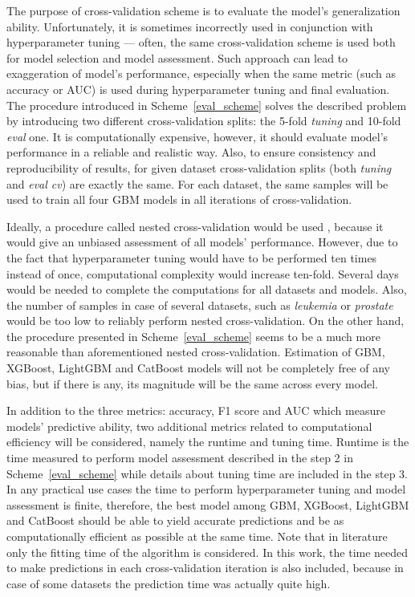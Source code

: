 \documentclass[magisterska, english]{pwr_wmat_praca_dyplomowa}
\theoremstyle{plain}
\numberwithin{theorem}{chapter}
\theoremstyle{definition}
\numberwithin{theorem}{chapter}
\begin{document}
The purpose of cross-validation scheme is to evaluate the model's generalization ability. Unfortunately, it is sometimes incorrectly used in conjunction with hyperparameter tuning --- often, the same cross-validation scheme is used both for model selection and model assessment. Such approach can lead to exaggeration of model's performance, especially when the same metric (such as accuracy or AUC) is used during hyperparameter tuning and final evaluation. The procedure introduced in Scheme~\ref{eval_scheme} solves the described problem by introducing two different cross-validation splits: the 5-fold \emph{tuning} and 10-fold \emph{eval} one.
It is computationally expensive, however, it should evaluate model's performance in a reliable and realistic way. Also, to ensure consistency and reproducibility of results, for given dataset cross-validation splits (both \emph{tuning} and \emph{eval cv}) are exactly the same. For each dataset, the same samples will be used to train all four GBM models in all iterations of cross-validation.

Ideally, a procedure called nested cross-validation would be used \cite{sklearn}, because it would give an unbiased assessment of all models' performance. However, due to the fact that hyperparameter tuning would have to be performed ten times instead of once, computational complexity would increase ten-fold. Several days would be needed to complete the computations for all datasets and models. Also, the number of samples in case of several datasets, such as \emph{leukemia} or \emph{prostate} would be too low to reliably perform nested cross-validation. On the other hand, the procedure presented in Scheme~\ref{eval_scheme} seems to be a much more reasonable than aforementioned nested cross-validation. Estimation of GBM, XGBoost, LightGBM and CatBoost models will not be completely free of any bias, but if there is any, its magnitude will be the same across every model.

In addition to the three metrics: accuracy, F1 score and AUC which measure models' predictive ability, two additional metrics related to computational efficiency will be considered, namely the runtime and tuning time. Runtime is the time measured to perform model assessment described in the step 2 in Scheme~\ref{eval_scheme} while details about tuning time are included in the step 3. In any practical use cases the time to perform hyperparameter tuning and model assessment is finite, therefore, the best model among GBM, XGBoost, LightGBM and CatBoost should be able to yield accurate predictions and be as computationally efficient as possible at the same time. Note that in literature only the fitting time of the algorithm is considered. In this work, the time needed to make predictions in each cross-validation iteration is also included, because in case of some datasets the prediction time was actually quite high.
\end{document}
